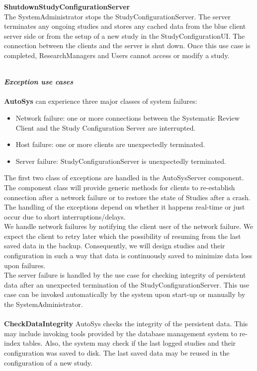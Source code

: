 \textbf{ShutdownStudyConfigurationServer}
\\
The SystemAdministrator stops the StudyConfigurationServer. The server terminates any ongoing studies and stores any cached data from the blue client server side or from the setup of a new study in the StudyConfigurationUI. The connection between the clients and the server is shut down. Once this use case is completed, ResearchManagers and Users cannot access or modify a study. 
\\\\

\newpage

\textit{\bf{Exception use cases}} 
\\\\
\textbf{AutoSys} can experience three major classes of system failures:

\begin{itemize}
	\item Network failure: one or more connections between the Systematic Review Client and the Study Configuration Server are interrupted.
	\item Host failure: one or more clients are unexpectedly terminated.
	\item Server failure: StudyConfigurationServer is unexpectedly terminated.
\end{itemize}

The first two class of exceptions are handled in the AutoSysServer component. The component class will provide generic methods for clients to re-establish connection after a network failure or to restore the state of Studies after a crash. The handling of the exceptions depend on whether it happens real-time or just occur due to short interruptions/delays. %
\\ 
We handle network failures by notifying the client user of the network failure. We expect the client to retry later which the possibility of resuming from the last saved data in the backup. Consequently, we will design studies and their configuration in such a way that data is continuously saved to minimize data loss upon failures. 
\\
The server failure is handled by the use case for checking integrity of persistent data after an unexpected termination of the StudyConfigurationServer. This use case can be invoked automatically by the system upon start-up or manually by the SystemAdministrator. 
\\\\

\textbf{CheckDataIntegrity}
AutoSys checks the integrity of the persistent data. This may include invoking tools provided by the database management system to re-index tables. Also, the system may check if the last logged studies and their configuration was saved to disk. The last saved data may be reused in the configuration of a new study. 

 
